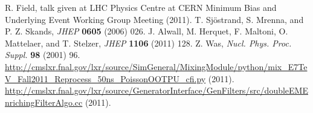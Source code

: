 \documentclass[12pt, letterpaper]{report}
\begin{document}
\begin{thebibliography}{99}
 R. Field, talk given at LHC Physics Centre at CERN Minimum Bias and Underlying Event Working Group Meeting (2011).
 T. Sj\"ostrand, S. Mrenna, and P. Z. Skands, \textit{JHEP} \textbf{0605} (2006) 026.
 J. Alwall, M. Herquet, F. Maltoni, O. Mattelaer, and T. Stelzer, \textit{JHEP} \textbf{1106} (2011) 128.
 Z. Was, \textit{Nucl. Phys. Proc. Suppl.} \textbf{98} (2001) 96.
 \url{http://cmslxr.fnal.gov/lxr/source/SimGeneral/MixingModule/python/mix_E7TeV_Fall2011_Reprocess_50ns_PoissonOOTPU_cfi.py} (2011).
 \url{http://cmslxr.fnal.gov/lxr/source/GeneratorInterface/GenFilters/src/doubleEMEnrichingFilterAlgo.cc} (2011).
\end{thebibliography}
\end{document}
